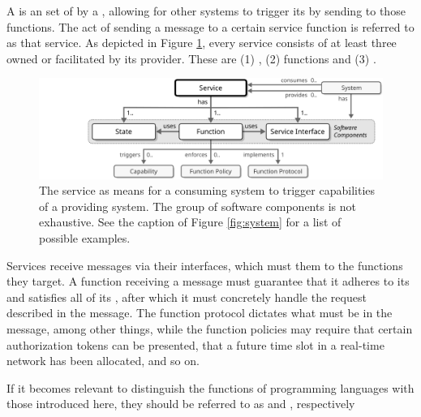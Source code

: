 A  is an  set of   by a , allowing for other systems to trigger its  by sending  to those functions.
The act of sending a message to a certain service function is referred to as  that service.
As depicted in Figure \ref{fig:service}, every service consists of at least three  owned or facilitated by its provider.
These are (1) , (2) functions and (3) .

\begin{figure}[ht!]
  \centering
  \includegraphics[scale=0.9]{figures/service}
  \caption{
    The service as means for a consuming system to trigger capabilities of a providing system.
    The group of software components is not exhaustive.
    See the caption of Figure \ref{fig:system} for a list of possible examples.
  }
  \label{fig:service}
\end{figure}

Services receive messages via their interfaces, which must  them to the functions they target.
A function receiving a message must guarantee that it adheres to its  and satisfies all of its , after which it must concretely handle the request described in the message.
The function protocol dictates what  must be in the message, among other things, while the function policies may require that certain authorization tokens can be presented, that a future time slot in a real-time network has been allocated, and so on.

If it becomes relevant to distinguish the functions of programming languages with those introduced here, they should be referred to as  and , respectively

